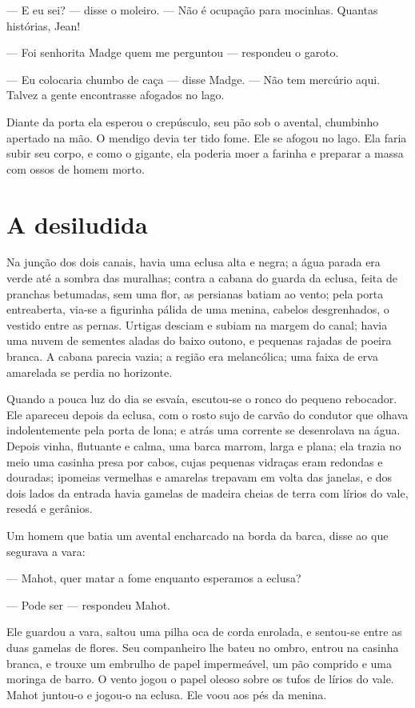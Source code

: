 --- E eu sei? --- disse o moleiro. --- Não é ocupação para mocinhas. Quantas
histórias, Jean!

--- Foi senhorita Madge quem me perguntou --- respondeu o garoto.

--- Eu colocaria chumbo de caça --- disse Madge. --- Não tem mercúrio aqui.
Talvez a gente encontrasse afogados no lago.

Diante da porta ela esperou o crepúsculo, seu pão sob o avental,
chumbinho apertado na mão. O mendigo devia ter tido fome. Ele se afogou no
lago. Ela faria subir seu corpo, e como o gigante, ela poderia moer a
farinha e preparar a massa com ossos de homem morto.

\section*{A desiludida}

Na junção dos dois canais, havia uma eclusa alta e negra; a água parada
era verde até a sombra das muralhas; contra a cabana do guarda da eclusa,
feita de pranchas betumadas, sem uma flor, as persianas batiam ao vento;
pela porta entreaberta, via-se a figurinha pálida de uma menina, cabelos
desgrenhados, o vestido entre as pernas. Urtigas desciam e subiam na
margem do canal; havia uma nuvem de sementes aladas do baixo outono, e
pequenas rajadas de poeira branca. A cabana parecia vazia; a região era
melancólica; uma faixa de erva amarelada se perdia no horizonte.

Quando a pouca luz do dia se esvaía, escutou-se o ronco do pequeno
rebocador. Ele apareceu depois da eclusa, com o rosto sujo de carvão do
condutor que olhava indolentemente pela porta de lona; e atrás uma
corrente se desenrolava na água. Depois vinha, flutuante e calma, uma
barca marrom, larga e plana; ela trazia no meio uma casinha presa por
cabos, cujas pequenas vidraças eram redondas e douradas; ipomeias
vermelhas e amarelas trepavam em volta das janelas, e dos dois lados da
entrada havia gamelas de madeira cheias de terra com lírios do vale,
resedá e gerânios.

Um homem que batia um avental encharcado na borda da barca, disse ao
que segurava a vara:

--- Mahot, quer matar a fome enquanto esperamos a eclusa?

--- Pode ser --- respondeu Mahot.

Ele guardou a vara, saltou uma pilha oca de corda enrolada, e sentou-se
entre as duas gamelas de flores. Seu companheiro lhe bateu no ombro,
entrou na casinha branca, e trouxe um embrulho de papel impermeável, um
pão comprido e uma moringa de barro. O vento jogou o papel oleoso
sobre os tufos de lírios do vale. Mahot juntou-o e jogou-o na eclusa. Ele
voou aos pés da menina.

